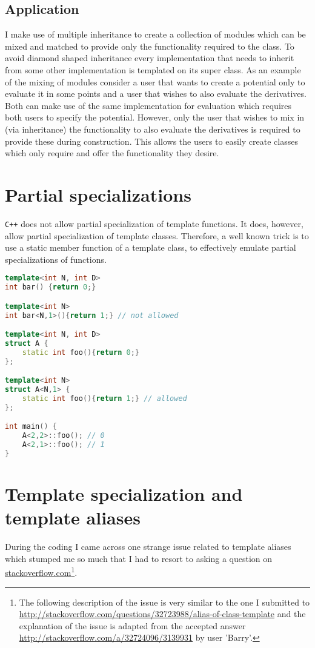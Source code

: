 \subsection{Application}
I make use of multiple inheritance to create a collection of modules which can be mixed and matched to provide only the functionality required to the class. To avoid diamond shaped inheritance every implementation that needs to inherit from some other implementation is templated on its super class. As an example of the mixing of modules consider a user that wants to create a potential only to evaluate it in some points and a user that wishes to also evaluate the derivatives. Both can make use of the same implementation for evaluation which requires both users to specify the potential. However, only the user that wishes to mix in (via inheritance) the functionality to also evaluate the derivatives is required to provide these during construction. This allows the users to easily create classes which only require and offer the functionality they desire. 

\section{Partial specializations}
\texttt{C++} does not allow partial specialization of template functions. It does, however, allow partial specialization of template classes. Therefore, a well known trick is to use a static member function of a template class, to effectively emulate partial specializations of functions.

\begin{minipage}{\textwidth}
\begin{lstlisting}[language=C++]
template<int N, int D>
int bar() {return 0;}

template<int N>
int bar<N,1>(){return 1;} // not allowed

template<int N, int D>
struct A {
	static int foo(){return 0;}
};

template<int N>
struct A<N,1> {
	static int foo(){return 1;} // allowed
};

int main() {
	A<2,2>::foo(); // 0
	A<2,1>::foo(); // 1
}
\end{lstlisting}
\end{minipage}

\section{Template specialization and template aliases}
During the coding I came across one strange issue related to template aliases which stumped me so much that I had to resort to asking a question on \url{stackoverflow.com}\footnote{The following description of the issue is very similar to the one I submitted to \url{http://stackoverflow.com/questions/32723988/alias-of-class-template} and the explanation of the issue is adapted from the accepted answer \url{http://stackoverflow.com/a/32724096/3139931} by user 'Barry'.}.

